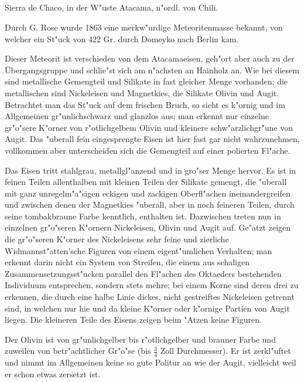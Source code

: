 \documentclass[a4paper, 11pt, oneside]{article}
\begin{document}
\subsection{}
\LARGE
\paragraph{}
Sierra de Chaco, in der W"uste Atacama, n"ordl. von Chili.

Durch G. Rose wurde 1863 eine merkw"urdige Meteoritenmasse bekannt, von welcher ein St"uck von 422 Gr. durch Domeyko nach Berlin kam.

Dieser Meteorit ist verschieden von dem Atacamaeisen, geh"ort aber auch zu der Übergangsgruppe und schlie"st sich am n"achsten an Hainholz an. Wie bei diesem sind metallische Gemengteil und Silikate in fast gleicher Menge vorhanden; die metallischen sind Nickeleisen und Magnetkies, die Silikate Olivin und Augit. Betrachtet man das St"uck auf dem frischen Bruch, so sieht es k"ornig und im Allgemeinen gr"unlichschwarz und glanzlos aus; man erkennt nur einzelne gr"o"sere K"orner von r"otlichgelbem Olivin und kleinere schw"arzlichgr"une von Augit. Das "uberall fein eingesprengte Eisen ist hier fast gar nicht wahrzunehmen, vollkommen aber unterscheiden sich die Gemengteil auf einer polierten Fl"ache.

Das Eisen tritt stahlgrau, metallgl"anzend und in gro"ser Menge hervor. Es ist in feinen Teilen allenthalben mit kleinen Teilen der Silikate gemengt, die "uberall mit ganz unregelm"a"sigen eckigen und zackigen Oberfl"achen ineinandergreifen und zwischen denen der Magnetkies "uberall, aber in noch feineren Teilen, durch seine tombakbraune Farbe kenntlich, enthalten ist. Dazwischen treten nun in einzelnen gr"o"seren K"ornern Nickeleisen, Olivin und Augit auf. Ge"atzt zeigen die gr"o"seren K"orner des Nickeleisens sehr feine und zierliche Widmannst"atten'sche Figuren von einem eigent"umlichen Verhalten; man erkennt darin nicht ein System von Streifen, die einem aus schaligen Zusammensetzungsst"ucken parallel den Fl"achen des Oktaeders bestehenden Individuum entsprechen, sondern stets mehre; bei einem Korne sind deren drei zu erkennen, die durch eine halbe Linie dickes, nicht gestreiftes Nickeleisen getrennt sind, in welchen nur hie und da kleine K"orner oder k"ornige Partien von Augit liegen. Die kleineren Teile des Eisens zeigen beim "Atzen keine Figuren.

Der Olivin ist von gr"unlichgelber bis r"otlichgelber und brauner Farbe und zuweilen von betr"achtlicher Gr"o"se (bis $\mathfrak{\frac{3}{4}}$ Zoll Durchmesser). Er ist zerkl"uftet und nimmt im Allgemeinen keine so gute Politur an wie der Augit, vielleicht weil er schon etwas zersetzt ist.
\end{document}
